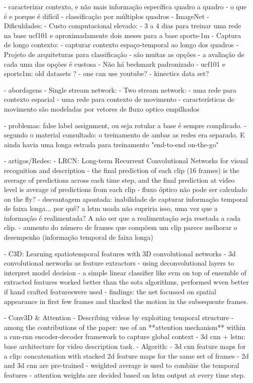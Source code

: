 - caracterizar contexto, e não mais informação específica quadro a quadro
- o que é e porque é difícil
  - classificação por múltiplos quadros
  - ImageNet
  - Dificuldades:
    - Custo computacional elevado:
      - 3 a 4 dias para treinar uma rede na base ucf101 e aproximadamente dois meses para a base sports-1m
    - Captura de longo contexto:
      - capturar contexto espaço-temporal ao longo dos quadros
    - Projeto de arquiteturas para classificação
      - são muitas as opções
      - a avaliação de cada uma das opções é custosa
    - Não há bechmark padronizado
      - ucf101 e sports1m: old datasets ?
      - one can use youtube?
      - kinectics data set?
      
- abordagens
  - Single stream network: 
  - Two stream network:
    - uma rede para contexto espacial
    - uma rede para contexto de movimento
    - características de movimento são modeladas por vetores de fluxo optico empilhados

    - problemas: false label assignment, ou seja rotular a base é sempre complicado. 
    - segundo o material consultado: o treinamento de ambas as redes era separado. E  ainda havia uma longa estrada para treinamento "end-to-end on-the-go"

- artigos/Redes:
  - LRCN: Long-term Recurrent Convolutional Networks for visual recognition and description
    - the final prediction of each clip (16 frames) is the average of predictions across each time step, and the final prediction at video level is average of predictions from each clip
    - fluxo óptico não pode ser calculado on the fly?
    - desvantagem apontada: inabilidade de capturar informação temporal de faixa longa... por quê? a lstm usada não supriria isso, uma vez que a informação é realimentada? A não ser que a realimentação seja resetada a cada clip. 
    - aumento do número de frames que compõem um clip parece melhorar o desempenho (informação temporal de faixa longa)
  
  - C3D: Learning spatiotemporal features with 3D convolutional networks
    - 3d convolutional nerworks as feature extractors
    - using deconvolutional layers to interpret model decision
    - a simple linear classifier like svm on top of ensemble of extracted features worked better than the sota algorithms, performed wven better if hand crafted featureswere used
    - findings: the net focussed on spatial appearance in first few frames and thacked the motion in the subsequente frames.

  - Conv3D \& Attention
    - Describing videos by exploiting temporal structure
    - among the contributions of the paper: use of an **attention mechanism** within a cnn-rnn encoder-decoder framework to capture global context
    - 3d cnn + lstm: base architecture for video description task.
    - Algorith:
      - 3d cnn feature maps for a clip: concatenation with stacked 2d feature maps for the same set of frames
      - 2d and 3d cnn are pre-trained
      - weighted average is used to combine the temporal features
      - attention weights are decided based on lstm output at every time step.

